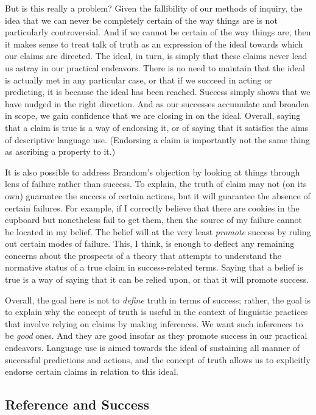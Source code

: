 But is this really a problem? Given the fallibility of our methods of inquiry, the idea that we can never be completely certain of the way things are is not particularly controversial. And if we cannot be certain of the way things are, then it makes sense to treat talk of truth as an expression of the ideal towards which our claims are directed. The ideal, in turn, is simply that these claims never lead us astray in our practical endeavors. There is no need to maintain that the ideal is actually met in any particular case, or that if we succeed in acting or predicting, it is because the ideal has been reached. Success simply shows that we have nudged in the right direction. And as our successes accumulate and broaden in scope, we gain confidence that we are closing in on the ideal. Overall, saying that a claim is true is a way of endorsing it, or of saying that it satisfies the aims of descriptive language use. (Endorsing a claim is importantly not the same thing as ascribing a property to it.) 

It is also possible to address Brandom's objection by looking at things through lens of failure rather than success. To explain, the truth of claim may not (on its own) guarantee the success of certain actions, but it will guarantee the absence of certain failures. For example, if I correctly believe that there are cookies in the cupboard but nonetheless fail to get them, then the source of my failure cannot be located in my belief. The belief will at the very least \textit{promote} success by ruling out certain modes of failure. This, I think, is enough to deflect any remaining concerns about the prospects of a theory that attempts to understand the normative status of a true claim in success-related terms. Saying that a belief is true is a way of saying that it can be relied upon, or that it will promote success.

Overall, the goal here is not to \textit{define} truth in terms of success; rather, the goal is to explain why the concept of truth is useful in the context of linguistic practices that involve relying on claims by making inferences. We want such inferences to be \textit{good} ones. And they are good insofar as they promote success in our practical endeavors. Language use is aimed towards the ideal of sustaining all manner of successful predictions and actions, and the concept of truth allows us to explicitly endorse certain claims in relation to this ideal.

\subsection{Reference and Success}

